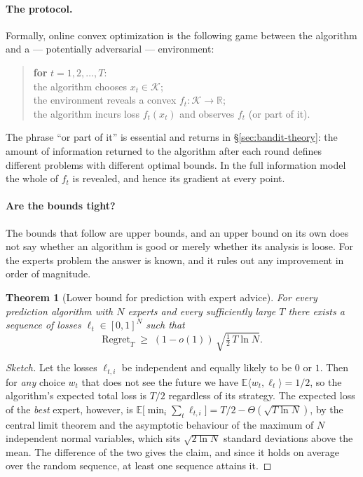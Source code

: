 \documentclass[12pt,a4paper,oneside]{report}
\renewcommand{\_}{\oldunderscore\allowbreak}
\theoremstyle{definition}
\theoremstyle{plain}
\newtheorem{theorem}{Theorem}[chapter]
\theoremstyle{remark}
\begin{document}
\paragraph{The protocol.} Formally, online convex optimization is the following game between
the algorithm and a --- potentially adversarial --- environment:

\begin{quote}
\textbf{for} $t = 1,2,\dots,T$:\\[2pt]
\hspace*{1em} the algorithm chooses $x_t \in \mathcal{K}$;\\
\hspace*{1em} the environment reveals a convex $f_t : \mathcal{K}\to\mathbb{R}$;\\
\hspace*{1em} the algorithm incurs loss $f_t(x_t)$ and observes $f_t$ (or part of it).
\end{quote}

The phrase ``or part of it'' is essential and returns in \S\ref{sec:bandit-theory}: the amount
of information returned to the algorithm after each round defines different problems with
different optimal bounds. In the full information model the whole of $f_t$ is revealed, and
hence its gradient at every point.

\paragraph{Are the bounds tight?} The bounds that follow are upper bounds, and an upper bound
on its own does not say whether an algorithm is good or merely whether its analysis is loose.
For the experts problem the answer is known, and it rules out any improvement in order of
magnitude.

\begin{theorem}[Lower bound for prediction with expert advice]
\label{thm:lower-bound}
For every prediction algorithm with $N$ experts and every sufficiently large $T$ there exists a
sequence of losses $\ell_t \in [0,1]^N$ such that
\[
\mathrm{Regret}_T \;\geq\; (1-o(1))\,\sqrt{\tfrac{1}{2}\,T \ln N}.
\]
\end{theorem}

\begin{proof}[Sketch]
Let the losses $\ell_{t,i}$ be independent and equally likely to be $0$ or $1$. Then for
\emph{any} choice $w_t$ that does not see the future we have
$\mathbb{E}\langle w_t,\ell_t\rangle = 1/2$, so the algorithm's expected total loss is $T/2$
regardless of its strategy. The expected loss of the \emph{best} expert, however, is
$\mathbb{E}\big[\min_i \sum_t \ell_{t,i}\big] = T/2 - \Theta(\sqrt{T\ln N})$, by the central
limit theorem and the asymptotic behaviour of the maximum of $N$ independent normal variables,
which sits $\sqrt{2\ln N}$ standard deviations above the mean. The difference of the two gives
the claim, and since it holds on average over the random sequence, at least one sequence
attains it.
\end{proof}
\end{document}
